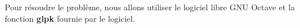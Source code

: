 \documentclass[../main.tex]{subfiles}
\begin{document}
Pour résoudre le problème, nous allons utiliser le logiciel libre GNU Octave et la fonction \textbf{glpk} fournie par le logiciel.

\newpage
\end{document}
